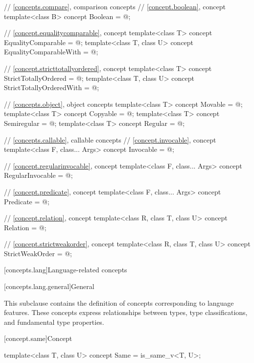 \begin{codeblock}
{  // \ref{concepts.compare}, comparison concepts
  // \ref{concept.boolean}, concept 
  template<class B>
    concept Boolean = @\seebelow@;

  // \ref{concept.equalitycomparable}, concept 
  template<class T>
    concept EqualityComparable = @\seebelow@;
  template<class T, class U>
    concept EqualityComparableWith = @\seebelow@;

  // \ref{concept.stricttotallyordered}, concept 
  template<class T>
    concept StrictTotallyOrdered = @\seebelow@;
  template<class T, class U>
    concept StrictTotallyOrderedWith = @\seebelow@;

  // \ref{concepts.object}, object concepts
  template<class T>
    concept Movable = @\seebelow@;
  template<class T>
    concept Copyable = @\seebelow@;
  template<class T>
    concept Semiregular = @\seebelow@;
  template<class T>
    concept Regular = @\seebelow@;

  // \ref{concepts.callable}, callable concepts
  // \ref{concept.invocable}, concept 
  template<class F, class... Args>
    concept Invocable = @\seebelow@;

  // \ref{concept.regularinvocable}, concept 
  template<class F, class... Args>
    concept RegularInvocable = @\seebelow@;

  // \ref{concept.predicate}, concept 
  template<class F, class... Args>
    concept Predicate = @\seebelow@;

  // \ref{concept.relation}, concept 
  template<class R, class T, class U>
    concept Relation = @\seebelow@;

  // \ref{concept.strictweakorder}, concept 
  template<class R, class T, class U>
    concept StrictWeakOrder = @\seebelow@;
}
\end{codeblock}

[concepts.lang]{Language-related concepts}

[concepts.lang.general]{General}

\pnum
This subclause contains the definition of concepts corresponding to language
features. These concepts express relationships between types, type
classifications, and fundamental type properties.

[concept.same]{Concept }

%
\begin{itemdecl}
template<class T, class U>
  concept Same = is_same_v<T, U>;
\end{itemdecl}

